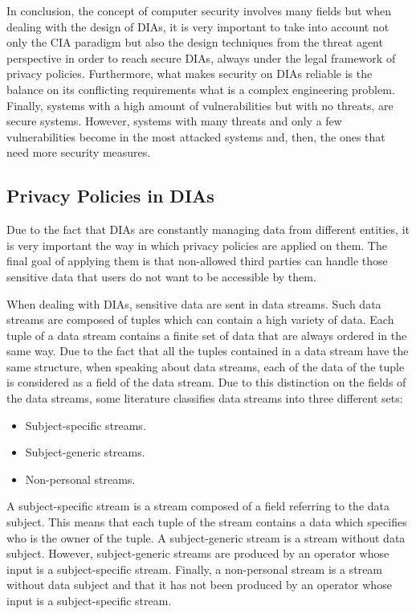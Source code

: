 {In conclusion, the concept of computer security involves many fields but when dealing with the design of DIAs, it is very important to take into account not only the CIA paradigm but also the design techniques from the threat agent perspective in order to reach secure DIAs, always under the legal framework of privacy policies. Furthermore, what makes security on DIAs reliable is the balance on its conflicting requirements what is a complex engineering problem. Finally, systems with a high amount of vulnerabilities but with no threats, are secure systems. However, systems with many threats and only a few vulnerabilities become in the most attacked systems and, then, the ones that need more security measures.
}

\subsection{Privacy Policies in DIAs}

Due to the fact that DIAs are constantly managing data from different entities, it is very important the way in which privacy policies are applied on them. The final goal of applying them is that non-allowed third parties can handle those sensitive data that users do not want to be accessible by them.

When dealing with DIAs, sensitive data are sent in data streams. Such data streams are composed of tuples which can contain a high variety of data. Each tuple of a data stream contains a finite set of data that are always ordered in the same way. Due to the fact that all the tuples contained in a data stream have the same structure, when speaking about data streams, each of the data of the tuple is considered as a field of the data stream. Due to this distinction on the fields of the data streams, some literature \cite{privacypoliciesarticle} classifies data streams into three different sets:

\begin{itemize}

\item Subject-specific streams.
\item Subject-generic streams.
\item Non-personal streams.

\end{itemize}

A subject-specific stream is a stream composed of a field referring to the data subject. This means that each tuple of the stream contains a data which specifies who is the owner of the tuple. A subject-generic stream is a stream without data subject. However, subject-generic streams are produced by an operator whose input is a subject-specific stream. Finally, a non-personal stream is a stream without data subject and that it has not been produced by an operator whose input is a subject-specific stream.

